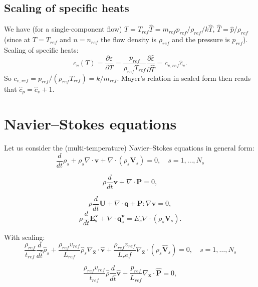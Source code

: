 \documentclass[a4paper,11pt,english]{article}
\begin{document}
\subsection{Scaling of specific heats}
We have (for a single-component flow) $T=T_{ref} \hat{T} = m_{ref} p_{ref} / \rho_{ref} / k \hat{T}$, $\hat{T} = \hat{p}/\rho_{ref}$ (since at $T=T_{ref}$ and $n=n_{ref}$ the flow density is $\rho_{ref}$ and the pressure is $p_{ref}$).
Scaling of specific heats:
\begin{equation}
    c_v(T) = \frac{\partial \varepsilon}{\partial T} = \frac{p_{ref}}{\rho_{ref}T_{ref}}\frac{\partial \hat{\varepsilon}}{\partial \hat{T}}=c_{v,ref} \hat{c}_{v}.
\end{equation}
So $c_{v,ref}=p_{ref} / (\rho_{ref}T_{ref}) = k / m_{ref}$. Mayer's relation in scaled form then reads that $\hat{c}_p = \hat{c}_v + 1$.

\section{Navier--Stokes equations}
Let us consider the (multi-temperature) Navier--Stokes equations in general form:
\begin{equation}
     \frac{d}{dt}\rho_s + \rho_s \nabla \cdot \mathbf{v} + \nabla \cdot (\rho_s \mathbf{V}_s) = 0,\quad s=1,\ldots,N_s
\end{equation}

\begin{equation}
     \rho \frac{d}{dt}\mathbf{v} + \nabla \cdot \mathbf{P} = 0,
\end{equation}

\begin{equation}
     \rho \frac{d}{dt}\mathbf{U} + \nabla \cdot \mathbf{q} + \mathbf{P} : \nabla \mathbf{v} = 0,
\end{equation}
\begin{equation}
     \rho \frac{d}{dt}\mathbf{E^v_s} + \nabla \cdot \mathbf{q^v_s} = E_s \nabla \cdot (\rho_s \mathbf{V}_s).
\end{equation}

With scaling:
\begin{equation}
    \frac{\rho_{ref}}{t_{ref}} \frac{d}{d\hat{t}}\hat{\rho}_s + \frac{\rho_{ref} v_{ref}}{L_{ref}} \hat{\rho}_s \nabla_{\hat{\mathbf{x}}} \cdot \hat{\mathbf{v}} + \frac{\rho_{ref}v_{ref}}{L_ref}\nabla_{\hat{\mathbf{x}}} \cdot (\rho_s \hat{\mathbf{V}}_s) = 0,\quad s=1,\ldots,N_s
\end{equation}

\begin{equation}
     \frac{\rho_{ref}v_{ref}}{t_{ref}} \hat{\rho} \frac{d}{d\hat{t}}\hat{\mathbf{v}} + \frac{p_{ref}}{L_{ref}}\nabla_{\hat{\mathbf{x}}} \cdot \hat{\mathbf{P}} = 0,
\end{equation}
\end{document}
